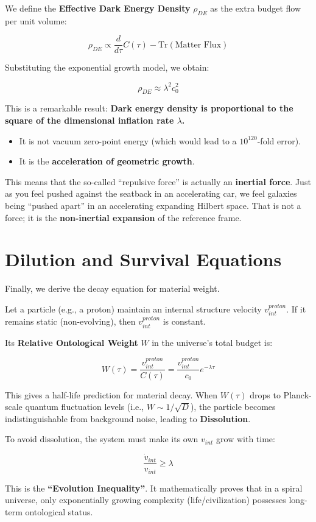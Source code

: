 We define the \textbf{Effective Dark Energy Density} $\rho_{DE}$ as the extra budget flow per unit volume:

\[\rho_{DE} \propto \frac{d}{d\tau} C(\tau) - \text{Tr}(\text{Matter Flux})\]

Substituting the exponential growth model, we obtain:

\[\rho_{DE} \approx \lambda^2 c_0^2\]

This is a remarkable result: \textbf{Dark energy density is proportional to the square of the dimensional inflation rate $\lambda$.}

\begin{itemize}
\item It is not vacuum zero-point energy (which would lead to a $10^{120}$-fold error).

\item It is the \textbf{acceleration of geometric growth}.
\end{itemize}

This means that the so-called ``repulsive force'' is actually an \textbf{inertial force}. Just as you feel pushed against the seatback in an accelerating car, we feel galaxies being ``pushed apart'' in an accelerating expanding Hilbert space. That is not a force; it is the \textbf{non-inertial expansion} of the reference frame.

\section{Dilution and Survival Equations}

Finally, we derive the decay equation for material weight.

Let a particle (e.g., a proton) maintain an internal structure velocity $v_{int}^{proton}$. If it remains static (non-evolving), then $v_{int}^{proton}$ is constant.

Its \textbf{Relative Ontological Weight} $W$ in the universe's total budget is:

\[W(\tau) = \frac{v_{int}^{proton}}{C(\tau)} = \frac{v_{int}^{proton}}{c_0} e^{-\lambda \tau}\]

This gives a half-life prediction for material decay. When $W(\tau)$ drops to Planck-scale quantum fluctuation levels (i.e., $W \sim 1/\sqrt{D}$), the particle becomes indistinguishable from background noise, leading to \textbf{Dissolution}.

To avoid dissolution, the system must make its own $v_{int}$ grow with time:

\[\frac{\dot{v}_{int}}{v_{int}} \ge \lambda\]

This is the \textbf{``Evolution Inequality''}. It mathematically proves that in a spiral universe, only exponentially growing complexity (life/civilization) possesses long-term ontological status.

